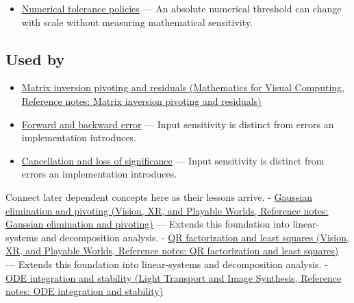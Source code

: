 \hypertarget{appendix-8f6a01f284a7-prerequisites}{}

\begin{itemize}
\tightlist
\item
  \hyperref[appendix-0ec599f8ba27]{Numerical tolerance policies} --- An absolute numerical threshold can change with scale without measuring mathematical sensitivity.
\end{itemize}

\subsection{Used by}\label{appendix-8f6a01f284a7-used-by}

\hypertarget{appendix-8f6a01f284a7-used-by}{}

\begin{itemize}
\item
  \href{../02-Mathematics-for-Visual-Computing/main.pdf\#nameddest=appendix-48d2e66378ab}{Matrix inversion pivoting and residuals (Mathematics for Visual Computing, Reference notes: Matrix inversion pivoting and residuals)}
\item
  \hyperref[appendix-a7fbaf6d1b1c]{Forward and backward error} --- Input sensitivity is distinct from errors an implementation introduces.
\item
  \hyperref[appendix-a2773a6a2f9d]{Cancellation and loss of significance} --- Input sensitivity is distinct from errors an implementation introduces.
\end{itemize}

Connect later dependent concepts here as their lessons arrive. - \href{../07-Vision-XR-and-Playable-Worlds/main.pdf\#nameddest=appendix-f6e77f4a200f}{Gaussian elimination and pivoting (Vision, XR, and Playable Worlds, Reference notes: Gaussian elimination and pivoting)} --- Extends this foundation into linear-systems and decomposition analysis. - \href{../07-Vision-XR-and-Playable-Worlds/main.pdf\#nameddest=appendix-c3421e6b4f2c}{QR factorization and least squares (Vision, XR, and Playable Worlds, Reference notes: QR factorization and least squares)} --- Extends this foundation into linear-systems and decomposition analysis. - \href{../04-Light-Transport-and-Image-Synthesis/main.pdf\#nameddest=appendix-18eacf61a04b}{ODE integration and stability (Light Transport and Image Synthesis, Reference notes: ODE integration and stability)}

